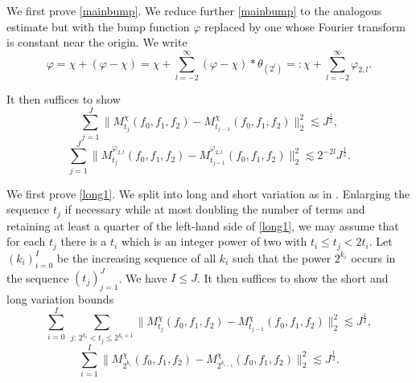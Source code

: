 \documentclass[12pt,reqno]{amsart}
\theoremstyle{plain}
\theoremstyle{definition}
\numberwithin{equation}{section}
\begin{document}
We first prove \eqref{mainbump}. 
We reduce further \eqref{mainbump} to the analogous estimate but with the bump function $\varphi$ replaced by one whose Fourier transform is constant near the origin. 
We write
\begin{equation*}%
\varphi = \chi + (\varphi - \chi) = \chi + \sum_{l=-2}^\infty (\varphi-\chi)\ast\theta_{(2^l)}
=: \chi + \sum_{l=-2}^\infty \varphi_{2,l}.
\end{equation*}

It then suffices to show
  \begin{equation}
      \label{long1}
      \sum_{j=1}^{J} \|M^{\chi}_{t_j}(f_0,f_1,f_2) - M^{\chi}_{t_{j-1}}(f_0,f_1,f_2)\|_{2}^2  \lesssim J^{\frac 12},
  \end{equation}
  \begin{equation}
      \label{long2}
      \sum_{j=1}^{J} \|M^{{\varphi_{2,l}}}_{t_j}(f_0,f_1,f_2) - M^{{\varphi_{2,l}}}_{t_{j-1}}(f_0,f_1,f_2)\|_{2}^2  \lesssim
      2^{-2l}J^{\frac 12}.
  \end{equation}

 
 We first prove \eqref{long1}. We split into long and short variation as in \cite{MR2434308}.
 Enlarging the sequence $t_j$ 
if necessary while at most doubling the number of terms and retaining at least a quarter of the left-hand side of \eqref{long1}, we may assume that for each $t_j$ there is a $t_i$ which is an integer  power of two with $t_i\le t_j<2t_i$.
Let $(k_i)_{i=0}^I$ be the increasing sequence of all $k_i$ such that 
the power $2^{k_i}$ occurs in the sequence $(t_j)_{j=1}^J$. We have $I\le J$.
It then suffices to show the short and long variation bounds 
\begin{equation}\label{mainbumpshort} \sum_{i=0}^I\,\sum_{j:\, 2^{k_i}< t_j\le 2^{k_{i}+1}} \|M^{\chi}_{t_{j}}(f_0,f_1,f_2) - M^{\chi}_{t_{j-1}}(f_0,f_1,f_2)\|_{2}^2  \lesssim J^{\frac 12} ,\end{equation}
\begin{equation}\label{mainbumplong} \sum_{i=1}^{I} \|M^{\chi}_{2^{k_i}}(f_0,f_1,f_2) - M^{\chi}_{2^{k_{i-1}}}(f_0,f_1,f_2)\|_{2}^2  \lesssim J^{\frac 12} .\end{equation}
\end{document}
